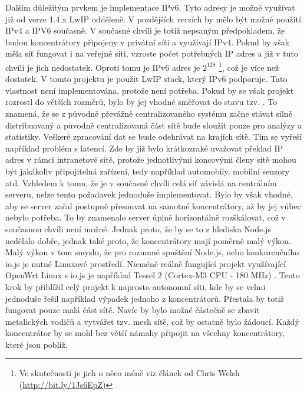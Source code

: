 Dalším důležitým prvkem je implementace IPv6.  Tyto adresy je možné využívat již od verze 1.4.x LwIP odděleně. V pozdějších verzích by mělo být možné použití IPv4 a IPV6 současně.  V současné chvíli je totiž nepsaným předpokladem, že budou koncentrátory připojeny v privátní síti a využívají IPv4.  Pokud by však měla síť fungovat i na veřejné síti, vzroste počet potřebných IP adres a již v tuto chvíli je jich nedostatek. Oproti tomu je IPv6 adres je $2^{128}$ \cite{ripe}\footnote{Ve skutečnosti je jich o něco méně viz článek od Chris Welsh  (\url{http://bit.ly/1Js6EpZ)}}, což je více než dostatek. V tomto projektu je použit LwIP stack, který IPv6 podporuje. Tato vlastnost není implementována, protože není potřeba. Pokud by se však projekt rozrostl do větších rozměrů, bylo by jej vhodné směřovat do stavu tzv. .  To znamená, že se z původně převážně centralizovaného systému začne stávat silně distribuovaný a původně centralizovaná část sítě bude sloužit pouze pro analýzy a statistiky. Veškeré zpracování dat se bude odehrávat na krajích sítě. Tím se vyřeší například problém s latencí. Zde by již bylo krátkozraké uvažovat překlad IP adres v rámci intranetové sítě, protože jednotlivými koncovými členy sítě mohou být jakákoliv připojitelná zařízení, tedy například automobily, mobilní senzory atd. Vzhledem k tomu, že je v současné chvíli celá síť závislá na centrálním serveru, nelze tento požadavek jednoduše implementovat. Bylo by však vhodné, aby se server začal postupně přesouvat na samotné koncentrátory, až by jej vůbec nebylo potřeba. To by znamenalo server úplně horizontálně rozškálovat, což v současnou chvíli není možné. Jednak proto, že by se to z hlediska Node.js  nedělalo dobře, jednak také proto, že koncentrátory mají poměrně malý výkon. Malý výkon v tom smyslu, že pro rozumné spuštění Node.js, nebo konkurenčního io.js je nutné Linuxové prostředí. Nicméně reálně fungující projekt využívající OpenWrt Linux \cite{openwrt} s io.js je například Tessel 2 (Cortex\texttrademark-M3 CPU - 180 MHz) \cite{tessel}.  Tento krok by přiblížil celý projekt k naprosto autonomní síti, kde by se velmi jednoduše řešil například výpadek jednoho z koncentrátorů. Přestala by totiž fungovat pouze malá část sítě. Navíc by bylo možné částečně se zbavit metalických vodičů a vytvářet tzv. mesh sítě, což by ostatně bylo žádoucí. Každý koncentrátor by se mohl bez větší námahy připojit na všechny koncentrátory, které jsou poblíž.

